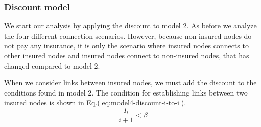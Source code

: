 \subsubsection{Discount model}
We start our analysis by applying the discount to model 2. As before we analyze the four different connection scenarios. However, because non-insured nodes do not pay any insurance, it is only the scenario where insured nodes connects to other insured nodes and insured nodes connect to non-insured nodes, that has changed compared to model 2.

When we consider links between insured nodes, we must add the discount to the conditions found in model 2. The condition for establishing links between two insured nodes is shown in Eq.(\ref{eq:model4-discount-i-to-i}).
\begin{equation}
\frac{I_{l}}{i+1}<\beta
\label{eq:model4-discount-i-to-i}
\end{equation}

